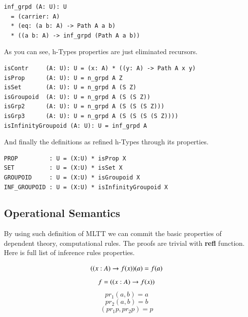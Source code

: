\documentclass{article}
\begin{document}
\begin{lstlisting}
inf_grpd (A: U): U
  = (carrier: A)
  * (eq: (a b: A) -> Path A a b)
  * ((a b: A) -> inf_grpd (Path A a b))
\end{lstlisting}

As you can see, h-Types properties are just eliminated recursors.

\begin{lstlisting}[mathescape=true]
isContr     (A: U): U = (x: A) * ((y: A) -> Path A x y)
isProp      (A: U): U = n_grpd A Z
isSet       (A: U): U = n_grpd A (S Z)
isGroupoid  (A: U): U = n_grpd A (S (S Z))
isGrp2      (A: U): U = n_grpd A (S (S (S Z)))
isGrp3      (A: U): U = n_grpd A (S (S (S (S Z))))
isInfinityGroupoid (A: U): U = inf_grpd A
\end{lstlisting}

And finally the definitions as refined h-Types through its properties.

\begin{lstlisting}[mathescape=true]
PROP         : U = (X:U) * isProp X
SET          : U = (X:U) * isSet X
GROUPOID     : U = (X:U) * isGroupoid X
INF_GROUPOID : U = (X:U) * isInfinityGroupoid X
\end{lstlisting}

\subsection{Operational Semantics}

By using such definition of MLTT we can commit the basic properties
of dependent theory, computational rules. The proofs are trivial
with {\bf refl} function. Here is full list of inference rules properties.

\begin{equation} (\\(x:A) \rightarrow f(x))(a) = f(a) \end{equation}
\begin{equation} f = (\\(x:A) \rightarrow f(x)) \end{equation}
\begin{equation} pr_1 (a,b) = a \end{equation}
\begin{equation} pr_2 (a,b) = b \end{equation}
\begin{equation} (pr_1 p,pr_2 p) = p \end{equation}
\end{document}
